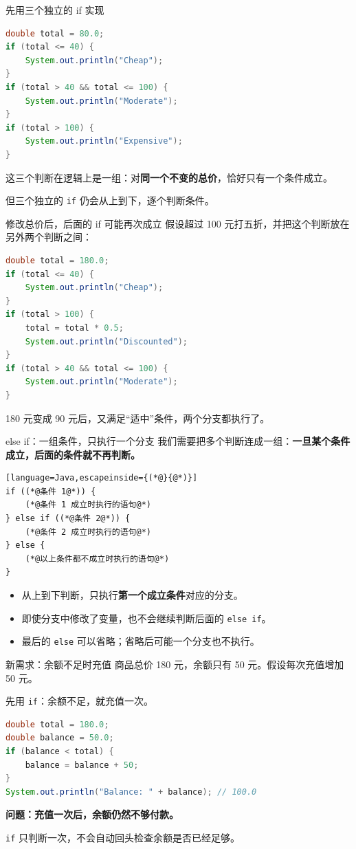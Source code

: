 \documentclass[aspectratio=169]{beamer}
\begin{document}
\begin{frame}[fragile]{先用三个独立的 if 实现}
  \begin{lstlisting}[language=Java]
double total = 80.0;
if (total <= 40) {
    System.out.println("Cheap");
}
if (total > 40 && total <= 100) {
    System.out.println("Moderate");
}
if (total > 100) {
    System.out.println("Expensive");
}
  \end{lstlisting}
  这三个判断在逻辑上是一组：对\textbf{同一个不变的总价}，恰好只有一个条件成立。
  \par\medskip
  但三个独立的 \texttt{if} 仍会从上到下，逐个判断条件。
\end{frame}

\begin{frame}[fragile]{修改总价后，后面的 if 可能再次成立}
  假设超过 100 元打五折，并把这个判断放在另外两个判断之间：
  \begin{lstlisting}[language=Java]
double total = 180.0;
if (total <= 40) {
    System.out.println("Cheap");
}
if (total > 100) {
    total = total * 0.5;
    System.out.println("Discounted");
}
if (total > 40 && total <= 100) {
    System.out.println("Moderate");
}
  \end{lstlisting}
  180 元变成 90 元后，又满足“适中”条件，两个分支都执行了。
\end{frame}

\begin{frame}[fragile]{else if：一组条件，只执行一个分支}
  我们需要把多个判断连成一组：\textbf{一旦某个条件成立，后面的条件就不再判断。}
  \par\medskip
  \begin{lstlisting}[language=Java,escapeinside={(*@}{@*)}]
if ((*@条件 1@*)) {
    (*@条件 1 成立时执行的语句@*)
} else if ((*@条件 2@*)) {
    (*@条件 2 成立时执行的语句@*)
} else {
    (*@以上条件都不成立时执行的语句@*)
}
  \end{lstlisting}
  \begin{itemize}
    \item 从上到下判断，只执行\textbf{第一个成立条件}对应的分支。
    \item 即使分支中修改了变量，也不会继续判断后面的 \texttt{else if}。
    \item 最后的 \texttt{else} 可以省略；省略后可能一个分支也不执行。
  \end{itemize}
\end{frame}

\begin{frame}[fragile]{新需求：余额不足时充值}
  商品总价 180 元，余额只有 50 元。假设每次充值增加 50 元。
  \par\medskip
  先用 \texttt{if}：余额不足，就充值一次。
  \begin{lstlisting}[language=Java]
double total = 180.0;
double balance = 50.0;
if (balance < total) {
    balance = balance + 50;
}
System.out.println("Balance: " + balance); // 100.0
  \end{lstlisting}
  \textbf{问题：充值一次后，余额仍然不够付款。}
  \par\medskip
  \texttt{if} 只判断一次，不会自动回头检查余额是否已经足够。
\end{frame}
\end{document}
